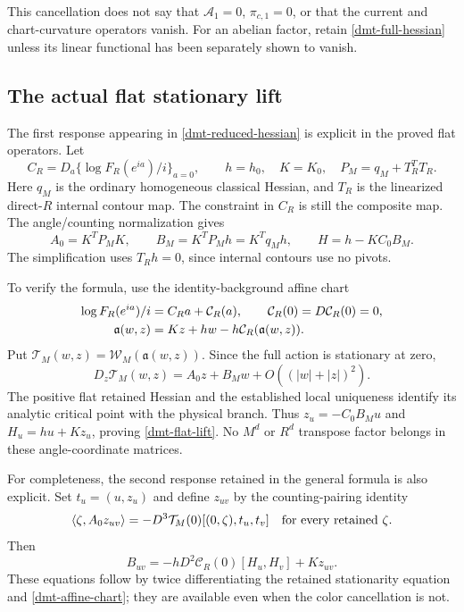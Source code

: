 \documentclass[11pt]{article}
\theoremstyle{remark}
\begin{document}
This cancellation does not say that
\(\mathscr A_1=0\), \(\pi_{c,1}=0\), or that the current and
chart-curvature operators vanish. For an abelian factor,
retain \eqref{dmt-full-hessian} unless its linear functional
has been separately shown to vanish.

\subsection{The actual flat stationary lift}
\label{dmt-lift-section}

The first response appearing in
\eqref{dmt-reduced-hessian} is explicit in the proved flat
operators. Let
\begin{equation}
 C_R=D_a\{\log F_R(e^{ia})/i\}_{a=0},\qquad
 h=h_0,\quad K=K_0,\quad P_M=q_M+T_R^TT_R.
 \label{dmt-flat-data}
\end{equation}
Here \(q_M\) is the ordinary homogeneous classical Hessian,
and \(T_R\) is the linearized direct-\(R\) internal contour
map. The constraint in \(C_R\) is still the composite map.
The angle/counting normalization gives
\begin{equation}
 A_0=K^TP_MK,\qquad
 B_M=K^TP_Mh=K^Tq_Mh,\qquad
 H=h-KC_0B_M.
 \label{dmt-flat-lift}
\end{equation}
The simplification uses \(T_Rh=0\), since internal contours
use no pivots.

To verify the formula, use the identity-background affine
chart
\begin{align}
 \log F_R(e^{ia})/i&=C_Ra+\mathcal C_R(a),
 \qquad \mathcal C_R(0)=D\mathcal C_R(0)=0,\notag\\
 \mathfrak a(w,z)&=Kz+hw-h\mathcal C_R(\mathfrak a(w,z)).
 \label{dmt-affine-chart}
\end{align}
Put
\(\mathcal T_M(w,z)=\mathcal W_M(\mathfrak a(w,z))\).
Since the full action is stationary at zero,
\begin{equation}
 D_z\mathcal T_M(w,z)
       =A_0z+B_Mw+O((|w|+|z|)^2).
 \label{dmt-affine-stationarity}
\end{equation}
The positive flat retained Hessian and the established
local uniqueness identify its analytic critical point
with the physical branch. Thus
\(z_u=-C_0B_Mu\) and \(H_u=hu+Kz_u\), proving
\eqref{dmt-flat-lift}. No \(M^d\) or \(R^d\) transpose
factor belongs in these angle-coordinate matrices.

For completeness, the second response retained in the
general formula is also explicit. Set \(t_u=(u,z_u)\)
and define \(z_{uv}\) by the counting-pairing identity
\begin{equation}
 \langle\zeta,A_0z_{uv}\rangle
       =-D^3\mathcal T_M(0)[(0,\zeta),t_u,t_v]
       \quad\hbox{for every retained }\zeta.
 \label{dmt-second-stationary}
\end{equation}
Then
\begin{equation}
 B_{uv}=-hD^2\mathcal C_R(0)[H_u,H_v]+Kz_{uv}.
 \label{dmt-second-background}
\end{equation}
These equations follow by twice differentiating the retained
stationarity equation and \eqref{dmt-affine-chart}; they are
available even when the color cancellation is not.
\end{document}
